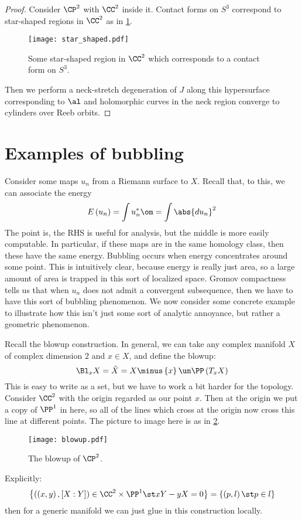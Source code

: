 \documentclass{amsart}
\begin{document}
\begin{proof}
Consider $\CP^2$ with $\CC^2$ inside it. 
Contact forms on $S^3$ correspond to star-shaped regions in $\CC^2$
as in \cref{fig:star_shaped}.
\begin{figure}
\texttt{[image: star\_shaped.pdf]}
\caption{Some star-shaped region in $\CC^2$ which corresponds to
a contact form on $S^3$.}
\label{fig:star_shaped}
\end{figure}
Then we perform a neck-stretch degeneration of $J$ along this hypersurface corresponding
to $\al$ and holomorphic curves in the neck region converge to cylinders over Reeb orbits.
\end{proof}

\section{Examples of bubbling}

Consider some maps $u_n$ from a Riemann surface to $X$. 
Recall that, to this, we can associate the energy
\begin{equation}
E\left( u_n \right) = \int u_n^* \om =
\int \abs{d u_n}^2
\end{equation}
The point is, the RHS is useful for analysis, but the middle is more easily computable.
In particular, if these maps are in the same homology class, then these have the same energy.
Bubbling occurs when energy concentrates around some point.
This is intuitively clear, because energy is really just area, so a large amount of
area is trapped in this sort of localized space.
Gromov compactness tells us that when $u_n$ does not admit a convergent subsequence, then
we have to have this sort of bubbling phenomenon.
We now consider some concrete example to illustrate how this isn't
just some sort of analytic annoyance, but rather a geometric phenomenon.

Recall the blowup construction.
In general, we can take any complex manifold $X$ of complex dimension $2$ and $x\in X$, and define
the blowup:
\begin{equation}
\Bl_x X = \tilde X = X\minus \left\{ x \right\}\un \PP\left( T_x X \right)
\end{equation}
This is easy to write as a set, but we have to work a bit harder for the topology.
Consider $\CC^2$ with the origin regarded as our point $x$.
Then at the origin we put a copy of $\PP^1$ in here, so all of the
lines which cross at the origin now cross this line at different points. 
The picture to image here is as in \cref{fig:blowup}.
\begin{figure}
\texttt{[image: blowup.pdf]}
\caption{The blowup of $\CP^2$.}
\label{fig:blowup}
\end{figure}
Explicitly:
\begin{equation}
\left\{ 
\left( \left( x,y \right) , \left[ X:Y \right] \right)\in \CC^2 \times \PP^1 \st
xY - yX = 0
\right\}=
\left\{ \left( p,l \right) \st p\in l \right\}
\end{equation}
then for a generic manifold we can just glue in this construction locally.
\end{document}
